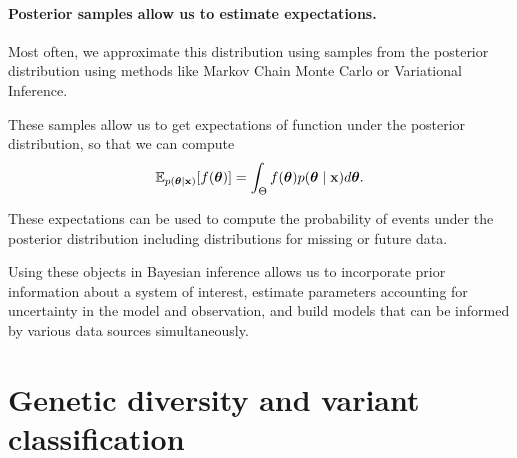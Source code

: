 \paragraph{Posterior samples allow us to estimate expectations.}%

Most often, we approximate this distribution using samples from the posterior distribution using methods like Markov Chain Monte Carlo or Variational Inference.

These samples allow us to get expectations of function under the posterior distribution, so that we can compute
\begin{align}
\mathbb{E}_{p(\boldsymbol{\mathbf{\theta}} \mid \boldsymbol{\mathbf{x}})}[f(\boldsymbol{\mathbf{\theta}})] = \int_{\Theta} f(\boldsymbol{\mathbf{\theta}}) p(\boldsymbol{\mathbf{\theta}} \mid \boldsymbol{\mathbf{x}}) d \boldsymbol{\mathbf{\theta}}.
\end{align}

These expectations can be used to compute the probability of events under the posterior distribution including distributions for missing or future data.



Using these objects in Bayesian inference allows us to incorporate prior information about a system of interest, estimate parameters accounting for uncertainty in the model and observation, and build models that can be informed by various data sources simultaneously.

\section{Genetic diversity and variant classification}

